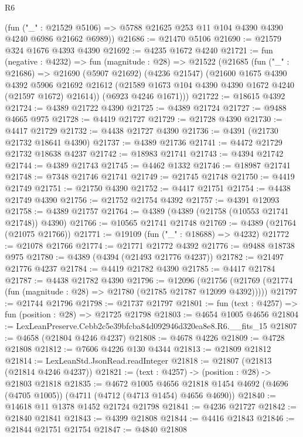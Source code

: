 \begin{lexlean}{R6}
\begin{coremodule}
      (fun ("_" : @21529 @5106) => @5788 @21625 @253 @11 @104 @4390 @4390 @4240 @6986 @21662 @6989))
@21686 := @21470 @5106
@21690 := @21579 @324 @1676 @4393 @4390
@21692 := @4235 @1672 @4240
@21721 := fun (negative : @4232) =>
  fun (magnitude : @28) =>
  @21522
    (@21685
      (fun ("_" : @21686) =>
      @21690
        (@5907 @21692)
        (@4236 @21547)
        (@21600
          @1675
          @4390
          @4392
          @5906
          @21692
          @21612
          (@21589 @1673 @104 @4390 @4390 @1672 @4240 (@21597 @1672) @21614))
        (@6923 @4246 @1671)))
@21722 := @18615 @4392
@21724 := @4389 @21722 @4390
@21725 := @4389 @21724
@21727 := @9488 @4665 @975
@21728 := @4419 @21727
@21729 := @21728 @4390
@21730 := @4417 @21729
@21732 := @4438 @21727 @4390
@21736 := @4391 (@21730 @21732 @18641 @4390)
@21737 := @4389 @21736
@21741 := @4472 @21729 @21732 @18638 @4237
@21742 := @18983 @21741
@21743 := @4394 @21742
@21744 := @4389 @21743
@21745 := @4462 @1332
@21746 := @18987 @21741
@21748 := @7348 @21746 @21741
@21749 := @21745 @21748
@21750 := @4419 @21749
@21751 := @21750 @4390
@21752 := @4417 @21751
@21754 := @4438 @21749 @4390
@21756 := @21752 @21754 @4392
@21757 := @4391 @12093
@21758 := @4389 @21757
@21764 := @4389 (@4389 (@21758 (@10553 @21741 @21748)) @4390)
@21766 := @10565 @21741 @21748
@21769 := @4389 (@21764 (@21075 @21766))
@21771 := @19109 (fun ("_" : @18688) => @4232)
@21772 := @21078 @21766
@21774 := @21771 @21772 @4392
@21776 := @9488 @18738 @975
@21780 := @4389 (@4394 (@21493 @21776 @4237))
@21782 := @21497 @21776 @4237
@21784 := @4419 @21782 @4390
@21785 := @4417 @21784
@21787 := @4438 @21782 @4390
@21796 := @12096
    (@21756 (@21769 (@21774 (fun (magnitude : @28) => @21780 (@21785 @21787 @12099 @4392)))))
@21797 := @21744 @21796
@21798 := @21737 @21797
@21801 := fun (text : @4257) => fun (position : @28) => @21725 @21798
@21803 := @4654 @1005 @4656
@21804 := LexLeanPreserve.Cebb2c5e39bfcba84d092946d320ea8e8.R6.__fits_15
@21807 := @4658 (@21804 @4246 @4237)
@21808 := @4678 @4226
@21809 := @4728 @21808
@21812 := @7606 @4226 @130 @4344
@21813 := @21809 @21812
@21814 := LexLeanStd.JsonRead.readInteger
@21818 := @21807 (@21813 (@21814 @4246 @4237))
@21821 := (text : @4257) -> (position : @28) -> @21803 @21818
@21835 := @4672
    @1005
    @4656
    @21818
    @1454
    @4692
    (@4696 (@4705 @1005))
    (@4711 (@4712 (@4713 @1454) @4656 @4690))
@21840 := @14618 @11 @1378 @1452 @21724 @21798
@21841 := @4236 @21727
@21842 := @21840 @21841
@21843 := @4399 @21808
@21844 := @4416 @21843
@21846 := @21844 @21751 @21754
@21847 := @4840 @21808

\end{coremodule}
\end{lexlean}
